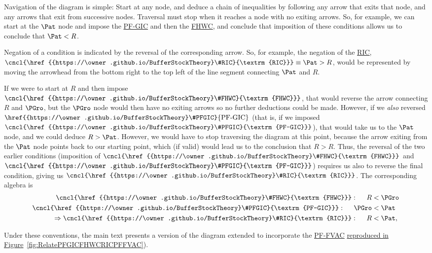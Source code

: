 \documentclass[\econtexRoot/BufferStockTheory]{subfiles}
\newcommand{\BSTlinkTo}{https://\owner.github.io/BufferStockTheory}
\renewcommand{\FHWC}{\href{{\BSTlinkTo}FHWC}{\textrm{FHWC}}}
\renewcommand{\FHWC}{\href{{\BSTlinkTo}\#FHWC}{\textrm{FHWC}}}
\renewcommand{\PFGIC}{\href{{\BSTlinkTo}\#PFGIC}{\textrm{PF-GIC}}}
\renewcommand{\RIC}{\href{{\BSTlinkTo}\#RIC}{\textrm{RIC}}}
\renewcommand{\PFFVAC}{\href{{\BSTlinkTo}\#PFFVAC}{\textrm{PF-FVAC}}}
\begin{document}
Navigation of the diagram is simple: Start at any node, and deduce a chain of inequalities by following any arrow that exits that node, and any arrows that exit from successive nodes.  Traversal must stop when it reaches a node with no exiting arrows.  So, for example, we can start at the $\Pat$ node and impose the {\PFGIC} and then the {\FHWC}, and conclude that imposition of these conditions allows us to conclude that $\Pat < {R}$.

Negation of a condition is indicated by the reversal of the corresponding arrow.  So, for example, the negation of the {\RIC},  $\cncl{\RIC} \equiv \Pat > {R}$, would be represented by moving the arrowhead from the bottom right to the top left of the line segment connecting {$\Pat$} and ${R}$.

If we were to start at ${R}$ and then impose $\cncl{\FHWC}$, that would reverse the arrow connecting ${R}$ and $\PGro$, but the $\PGro$ node would then have no exiting arrows so no further deductions could be made.  However, if we \textit{also} reversed $\PFGIC$ (that is, if we imposed $\cncl{\PFGIC}$), that would take us to the $\Pat$ node, and we could deduce ${R} > \Pat$.  However, we would have to stop traversing the diagram at this point, because the arrow exiting from the $\Pat$ node points back to our starting point, which (if valid) would lead us to the conclusion that ${R} > {R}$.  Thus, the reversal of the two earlier conditions (imposition of $\cncl{\FHWC}$ and $\cncl{\PFGIC}$) requires us also to reverse the final condition, giving us $\cncl{\RIC}$.  The corresponding algebra is
\begin{equation}\begin{gathered}\begin{aligned}
  \cncl{\FHWC}:~~~~  {R} & < \PGro \notag  
  \\ \cncl{\PFGIC}:~~~~ \PGro & < \Pat %
                                \label{eq:cnclRIC}
  \\ \Rightarrow \cncl{\RIC}:~~~~{R} & < \Pat \notag,
\end{aligned}\end{gathered}\end{equation}

Under these conventions, the main text presents a version of the diagram extended to incorporate the {\PFFVAC} \href{https://econ-ark.github.io/BufferStockTheory/#RelatePFGICFHWCRICPFFVAC}{reproduced in Figure}~\ref{fig:RelatePFGICFHWCRICPFFVAC}).%
\end{document}
